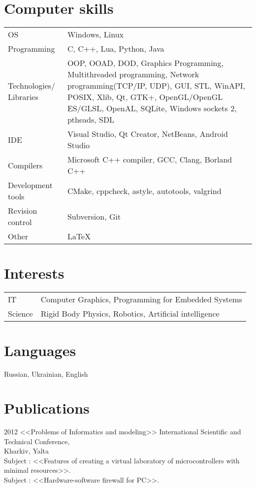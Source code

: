 \documentclass[11pt,a4paper]{article}
\begin{document}
\section*{Computer skills}
\begin{tabular}{p{4cm} p{12cm}}
OS & Windows, Linux\\
Programming & C, C++, Lua, Python, Java\\
Technologies/
Libraries & OOP, OOAD, DOD, Graphics Programming, Multithreaded programming, Network programming(TCP/IP, UDP), GUI, STL, WinAPI, POSIX, Xlib, Qt, GTK+, OpenGL/OpenGL ES/GLSL, OpenAL, SQLite, Windows sockets 2, ptheads, SDL\\
IDE & Visual Studio, Qt Creator, NetBeans, Android Studio\\
Compilers & Microsoft C++ compiler, GCC, Clang, Borland C++\\
Development tools & CMake, cppcheck, astyle, autotools, valgrind\\
Revision control & Subversion, Git\\
Other & LaTeX\\
\end{tabular}
\section*{Interests}
\begin{tabular}{p{4cm} p{12cm}}
IT & Computer Graphics, Programming for Embedded Systems\\
Science & Rigid Body Physics, Robotics, Artificial intelligence\\
\end{tabular}
\section*{Languages}
Russian, Ukrainian, English
\section*{Publications}
2012 <<Problems of Informatics and modeling>> International Scientific and Technical Conference,\\ Kharkiv, Yalta\\
Subject : <<Features of creating a virtual laboratory of microcontrollers with minimal resources>>.\\
Subject : <<Hardware-software firewall for PC>>.
\end{document}
